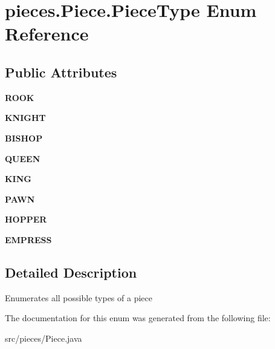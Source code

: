 \hypertarget{enumpieces_1_1_piece_1_1_piece_type}{}\section{pieces.\+Piece.\+Piece\+Type Enum Reference}
\label{enumpieces_1_1_piece_1_1_piece_type}
\subsection*{Public Attributes}
\begin{DoxyCompactItemize}
\item 
\mbox{\label{enumpieces_1_1_piece_1_1_piece_type_ae9246c6b79d9270f24c0f56ef8616f10}} 
{\bfseries R\+O\+OK}
\item 
\mbox{\label{enumpieces_1_1_piece_1_1_piece_type_a4c2175112ee8d0580999fef4502069b2}} 
{\bfseries K\+N\+I\+G\+HT}
\item 
\mbox{\label{enumpieces_1_1_piece_1_1_piece_type_a75e9d99ebb65cc880615125a3895d48c}} 
{\bfseries B\+I\+S\+H\+OP}
\item 
\mbox{\label{enumpieces_1_1_piece_1_1_piece_type_a972a7aa9900cf61ee2d3d4345cb9ac95}} 
{\bfseries Q\+U\+E\+EN}
\item 
\mbox{\label{enumpieces_1_1_piece_1_1_piece_type_a3767b86f2f592d65dcbb4e25eefd3154}} 
{\bfseries K\+I\+NG}
\item 
\mbox{\label{enumpieces_1_1_piece_1_1_piece_type_ab6459d334bc119338c2f8877c83f73dc}} 
{\bfseries P\+A\+WN}
\item 
\mbox{\label{enumpieces_1_1_piece_1_1_piece_type_ab8002b8b7b6e97d0ad80af51cbbaaaa0}} 
{\bfseries H\+O\+P\+P\+ER}
\item 
\mbox{\label{enumpieces_1_1_piece_1_1_piece_type_af93598980cebeb27a6eb432add6cad9c}} 
{\bfseries E\+M\+P\+R\+E\+SS}
\end{DoxyCompactItemize}


\subsection{Detailed Description}
Enumerates all possible types of a piece 

The documentation for this enum was generated from the following file\+:\begin{DoxyCompactItemize}
\item 
src/pieces/Piece.\+java\end{DoxyCompactItemize}
